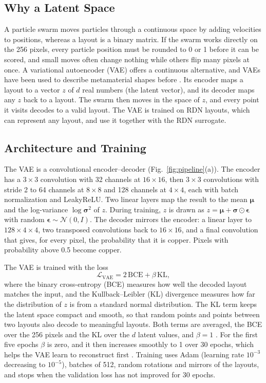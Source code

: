 \documentclass[journal]{IEEEtran}
\begin{document}
\subsection{Why a Latent Space}
A particle swarm moves particles through a continuous space by adding velocities to positions, whereas a layout is a binary matrix. If the swarm works directly on the 256 pixels, every particle position must be rounded to 0 or 1 before it can be scored, and small moves often change nothing while others flip many pixels at once. A variational autoencoder (VAE) \cite{kingma} offers a continuous alternative, and VAEs have been used to describe metamaterial shapes before \cite{ma_vae}. Its encoder maps a layout to a vector $z$ of $d$ real numbers (the latent vector), and its decoder maps any $z$ back to a layout. The swarm then moves in the space of $z$, and every point it visits decodes to a valid layout. The VAE is trained on RDN layouts, which can represent any layout, and use it together with the RDN surrogate.

\subsection{Architecture and Training}
The VAE is a convolutional encoder--decoder (Fig.~\ref{fig:pipeline}(a)). The encoder has a $3\times3$ convolution with 32 channels at $16\times16$, then $3\times3$ convolutions with stride 2 to 64 channels at $8\times8$ and 128 channels at $4\times4$, each with batch normalization and LeakyReLU. Two linear layers map the result to the mean $\boldsymbol\mu$ and the log-variance $\log\boldsymbol\sigma^2$ of $z$. During training, $z$ is drawn as $z=\boldsymbol\mu+\boldsymbol\sigma\odot\boldsymbol\epsilon$ with random $\boldsymbol\epsilon\sim\mathcal{N}(0,I)$. The decoder mirrors the encoder: a linear layer to $128\times4\times4$, two transposed convolutions back to $16\times16$, and a final convolution that gives, for every pixel, the probability that it is copper. Pixels with probability above 0.5 become copper.

The VAE is trained with the loss
\begin{equation}
\mathcal{L}_{\mathrm{VAE}}=2\,\mathrm{BCE}+\beta\,\mathrm{KL},
\label{eq:vae}
\end{equation}
where the binary cross-entropy (BCE) measures how well the decoded layout matches the input, and the Kullback--Leibler (KL) divergence measures how far the distribution of $z$ is from a standard normal distribution. The KL term keeps the latent space compact and smooth, so that random points and points between two layouts also decode to meaningful layouts. Both terms are averaged, the BCE over the 256 pixels and the KL over the $d$ latent values, and $\beta=1$ \cite{betavae}. For the first five epochs $\beta$ is zero, and it then increases smoothly to 1 over 30 epochs, which helps the VAE learn to reconstruct first \cite{bowman}. Training uses Adam \cite{adam} (learning rate $10^{-3}$ decreasing to $10^{-5}$), batches of 512, random rotations and mirrors of the layouts, and stops when the validation loss has not improved for 30 epochs.
\end{document}
